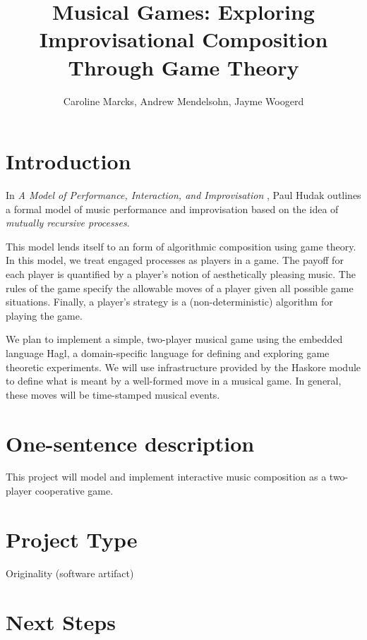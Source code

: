\documentclass{proc}
\begin{document}
\title{Musical Games: Exploring Improvisational Composition Through Game
Theory}

\author{Caroline Marcks, Andrew Mendelsohn, Jayme Woogerd}

\maketitle

\section{Introduction}

In \emph{A Model of Performance, Interaction, and Improvisation} \cite{hudakberger95}, Paul Hudak
outlines a formal model of music performance and improvisation based on the idea of  \emph{mutually recursive processes}.  

This model lends itself to an form of algorithmic composition using game theory.  In this model, we treat engaged processes as players in a game.  The payoff for each player is quantified by a player's notion of aesthetically pleasing music.  The rules of the game specify the allowable moves of a player given all possible game situations.  Finally, a player's strategy is a (non-deterministic) algorithm for playing the game.

We plan to implement a simple, two-player musical game using the embedded language Hagl, a domain-specific language for defining and exploring game theoretic experiments.  We will use infrastructure provided by the Haskore module to define what is meant by a well-formed move in a musical game.  In general, these moves will be time-stamped musical events.

\section{One-sentence description}

This project will model and implement interactive music composition as a two-player cooperative game.

\section{Project Type}

Originality (software artifact)

\section{Next Steps}
\end{document}
